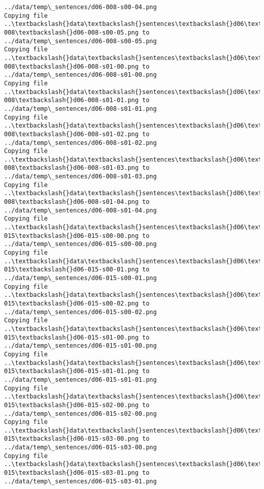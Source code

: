 \documentclass[11pt]{article}
\begin{document}
\begin{Verbatim}[commandchars=\\\{\}]
../data/temp\_sentences/d06-008-s00-04.png
Copying file ..\textbackslash{}data\textbackslash{}sentences\textbackslash{}d06\textbackslash{}d06-008\textbackslash{}d06-008-s00-05.png to
../data/temp\_sentences/d06-008-s00-05.png
Copying file ..\textbackslash{}data\textbackslash{}sentences\textbackslash{}d06\textbackslash{}d06-008\textbackslash{}d06-008-s01-00.png to
../data/temp\_sentences/d06-008-s01-00.png
Copying file ..\textbackslash{}data\textbackslash{}sentences\textbackslash{}d06\textbackslash{}d06-008\textbackslash{}d06-008-s01-01.png to
../data/temp\_sentences/d06-008-s01-01.png
Copying file ..\textbackslash{}data\textbackslash{}sentences\textbackslash{}d06\textbackslash{}d06-008\textbackslash{}d06-008-s01-02.png to
../data/temp\_sentences/d06-008-s01-02.png
Copying file ..\textbackslash{}data\textbackslash{}sentences\textbackslash{}d06\textbackslash{}d06-008\textbackslash{}d06-008-s01-03.png to
../data/temp\_sentences/d06-008-s01-03.png
Copying file ..\textbackslash{}data\textbackslash{}sentences\textbackslash{}d06\textbackslash{}d06-008\textbackslash{}d06-008-s01-04.png to
../data/temp\_sentences/d06-008-s01-04.png
Copying file ..\textbackslash{}data\textbackslash{}sentences\textbackslash{}d06\textbackslash{}d06-015\textbackslash{}d06-015-s00-00.png to
../data/temp\_sentences/d06-015-s00-00.png
Copying file ..\textbackslash{}data\textbackslash{}sentences\textbackslash{}d06\textbackslash{}d06-015\textbackslash{}d06-015-s00-01.png to
../data/temp\_sentences/d06-015-s00-01.png
Copying file ..\textbackslash{}data\textbackslash{}sentences\textbackslash{}d06\textbackslash{}d06-015\textbackslash{}d06-015-s00-02.png to
../data/temp\_sentences/d06-015-s00-02.png
Copying file ..\textbackslash{}data\textbackslash{}sentences\textbackslash{}d06\textbackslash{}d06-015\textbackslash{}d06-015-s01-00.png to
../data/temp\_sentences/d06-015-s01-00.png
Copying file ..\textbackslash{}data\textbackslash{}sentences\textbackslash{}d06\textbackslash{}d06-015\textbackslash{}d06-015-s01-01.png to
../data/temp\_sentences/d06-015-s01-01.png
Copying file ..\textbackslash{}data\textbackslash{}sentences\textbackslash{}d06\textbackslash{}d06-015\textbackslash{}d06-015-s02-00.png to
../data/temp\_sentences/d06-015-s02-00.png
Copying file ..\textbackslash{}data\textbackslash{}sentences\textbackslash{}d06\textbackslash{}d06-015\textbackslash{}d06-015-s03-00.png to
../data/temp\_sentences/d06-015-s03-00.png
Copying file ..\textbackslash{}data\textbackslash{}sentences\textbackslash{}d06\textbackslash{}d06-015\textbackslash{}d06-015-s03-01.png to
../data/temp\_sentences/d06-015-s03-01.png

\end{Verbatim}
\end{document}
